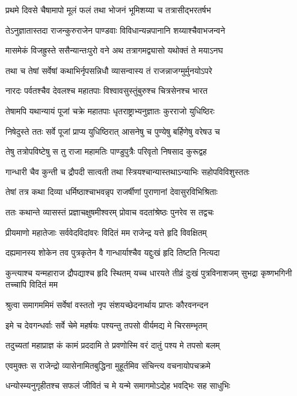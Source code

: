 \twolineshloka
{प्रथमे दिवसे चैषामापो मूलं फलं तथा}
{भोजनं भूमिशय्या च तत्रासीद्भरतर्षभ}


\twolineshloka
{तेऽनुज्ञातास्तदा राजन्कुरुराजेन पाण्डवाः}
{विविधान्यन्नपानानि शय्याश्चैवाभजन्वने}


\twolineshloka
{मासमेकं विजह्रुस्ते ससैन्यान्तःपुरो वने}
{अथ तत्रागमद्व्यासो यथोक्तं ते मयाऽनघ}


\twolineshloka
{तथा च तेषां सर्वेषां कथाभिर्नृपसन्निधौ}
{व्यासन्वास्य तं राजन्नाजग्मुर्मुनयोऽपरे}


\twolineshloka
{नारदः पर्वतश्चैव देवलश्च महातपाः}
{विश्वावसुस्तुंबुरुश्च चित्रसेनश्च भारत}


\twolineshloka
{तेषामपि यथान्यायं पूजां चक्रे महातपाः}
{धृतराष्ट्राभ्यनुज्ञातः कुरराजो युधिष्ठिरः}


\twolineshloka
{निषेदुस्ते ततः सर्वे पूजां प्राप्य युधिष्ठिरात्}
{आसनेषु च पुण्येषु बर्हिणेषु वरेषउ च}


\twolineshloka
{तेषु तत्रोपविष्टेषु स तु राजा महामतिः}
{पाण्डुपुत्रैः परिवृतो निषसाद कुरूद्वह}


\twolineshloka
{गान्धारी चैव कुन्ती च द्रौपदी सात्वती तथा}
{स्त्रियश्चान्यास्तथाऽन्याभिः सहोपविविशुस्ततः}


\twolineshloka
{तेषां तत्र कथा दिव्या धर्मिष्ठाश्चाभवन्नृप}
{राजर्षीणां पुराणानां देवासुरविभिश्रिताः}


\twolineshloka
{ततः कथान्ते व्यासस्तं प्रज्ञाचक्षुषमीश्वरम्}
{प्रोवाच वदतांश्रेष्ठः पुनरेव स तद्वचः}


\twolineshloka
{प्रीयमाणो महातेजाः सर्ववेदविदांवरः}
{विदितं मम राजेन्द्र यत्ते हृदि विवक्षितम्}


\twolineshloka
{दह्यमानस्य शोकेन तव पुत्रकृतेन वै}
{गान्धार्याश्चैव यद्दुःखं हृदि तिष्टति नित्यदा}


\threelineshloka
{कुन्त्याश्च यन्महाराज द्रौपद्याश्च हृदि स्थितम्}
{यच्च धारयते तीव्रं दुःखं पुत्रविनाशजम्}
{सुभद्रा कृष्णभगिनी तच्चापि विदितं मम}


\twolineshloka
{श्रुत्वा समागममिमं सर्वेषां वस्ततो नृप}
{संशयच्छेदनार्थाय प्राप्तः कौरवनन्दन}


\twolineshloka
{इमे च देवगन्धर्वाः सर्वे चेमे महर्षयः}
{पश्यन्तु तपसो वीर्यमद्य मे चिरसम्भृतम्}


\twolineshloka
{तदुच्यतां महाप्राज्ञ कं कामं प्रददामि ते}
{प्रवणोस्मि वरं दातुं पश्य मे तपसो बलम्}


\twolineshloka
{एवमुक्तः स राजेन्द्रो व्यासेनामितबुद्धिना}
{मुहूर्तमिव संचिन्त्य वचनायोपचक्रमे}


\twolineshloka
{धन्योस्म्यनुगृहीतश्च सफलं जीवितं च मे}
{यन्मे समागमोऽद्येह भवद्भिः सह साधुभिः}


